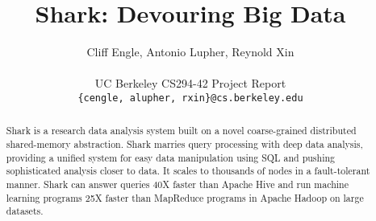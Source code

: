 \documentclass[preprint]{acm_proc_article-sp}
\begin{document}
\title{Shark: Devouring Big Data}

\author{
Cliff Engle,
Antonio Lupher,
Reynold Xin\\\\
UC Berkeley CS294-42 Project Report\\
\texttt{\{cengle, alupher, rxin\}@cs.berkeley.edu}
}

\maketitle
\begin{abstract}
Shark is a research data analysis system built on a novel coarse-grained distributed shared-memory abstraction. Shark marries query processing with deep data analysis, providing a unified system for easy data manipulation using SQL and pushing sophisticated analysis closer to data. It scales to thousands of nodes in a fault-tolerant manner. Shark can answer queries 40X faster than Apache Hive and run machine learning programs 25X faster than MapReduce programs in Apache Hadoop on large datasets.
\end{abstract}



























\end{document}
